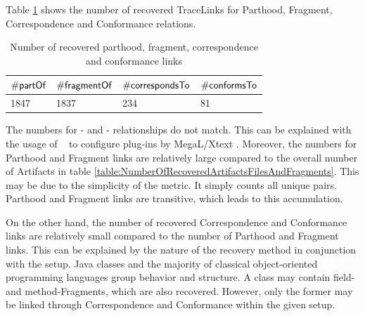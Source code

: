 Table \ref{table:NumberOfRecoveredParthoodFragmentCorrespondenceAndConformanceLinks} shows the number of recovered \glspl{TraceLink} for \gls{Parthood}, \gls{Fragment}, \gls{Correspondence} and \gls{Conformance} relations.
\begin{table}[h!]
\begin{center}
\begin{tabular}{|l|l|l|l|}
\hline
$\#\textsf{partOf}$ & $\#\textsf{fragmentOf}$ & $\#\textsf{correspondsTo}$ & $\#\textsf{conformsTo}$
\\ \hline
1847 & 1837 & 234 & 81 
\\ \hline
\end{tabular}
\end{center}
\caption{Number of recovered parthood, fragment, correspondence and conformance links}
\label{table:NumberOfRecoveredParthoodFragmentCorrespondenceAndConformanceLinks}
\end{table}
The numbers for \partOf- and \fragmentOf- relationships do not match.
This can be explained with the usage of \partOf~ to configure plug-ins by \gls{MegaL/Xtext} \cite{LukasHaertelBScThesis}.
Moreover, the numbers for \gls{Parthood} and \gls{Fragment} links are relatively large compared to the overall number of \glspl{Artifact} in table \ref{table:NumberOfRecoveredArtifactsFilesAndFragments}.
This may be due to the simplicity of the metric.
It simply counts all unique pairs.
\Gls{Parthood} and \gls{Fragment} links are transitive, which leads to this accumulation.

On the other hand, the number of recovered \gls{Correspondence} and \gls{Conformance} links are relatively small compared to the number of \Gls{Parthood} and \gls{Fragment} links.
This can be explained by the nature of the recovery method in conjunction with the setup.
\gls{Java} classes and the majority of classical object-oriented programming languages group behavior and structure.
A class may contain field- and method-\glspl{Fragment}, which are also recovered.
However, only the former may be linked through \gls{Correspondence} and \gls{Conformance} within the given setup.

